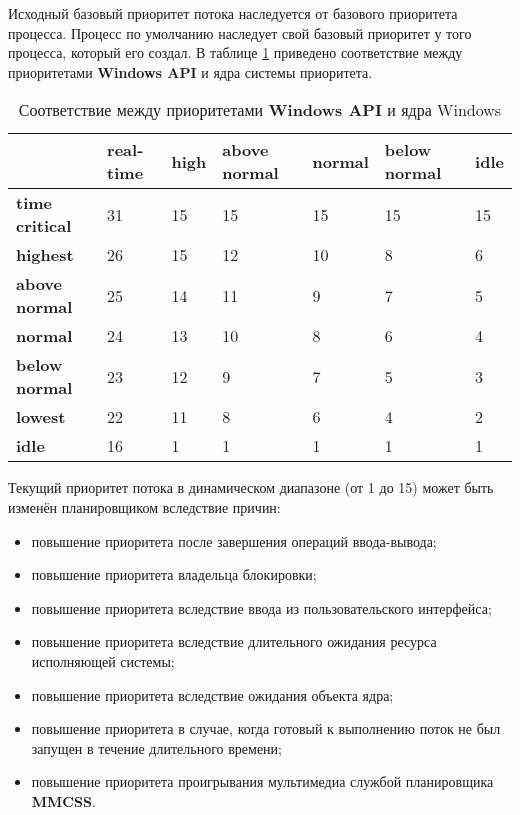 \noindent Исходный базовый приоритет потока наследуется от базового приоритета процесса. Процесс по умолчанию наследует свой базовый приоритет у того процесса, который его создал. В таблице \ref{tbl:priority} приведено соответствие между приоритетами \textbf{Windows API} и ядра системы приоритета.

\begin{table}[h]
    \caption{Соответствие между приоритетами \textbf{Windows API} и ядра Windows}
    \begin{center}
        \begin{tabular}{|l|p{45pt}|p{45pt}|p{45pt}|p{45pt}|p{45pt}|p{45pt}|}
            \hline
            {} & \textbf{real-time} & \textbf{high} & \textbf{above normal} & \textbf{normal} & \textbf{below normal} & \textbf{idle}\\
            \hline
            \textbf{time critical} & 31 & 15 & 15 & 15 & 15 & 15 \\
            \hline
            \textbf{highest} & 26 & 15 & 12 & 10 & 8 & 6 \\
            \hline
            \textbf{above normal} & 25 & 14 & 11 & 9 & 7 & 5 \\
            \hline
            \textbf{normal} & 24 & 13 & 10 & 8 & 6 & 4 \\
            \hline
            \textbf{below normal} & 23 & 12 & 9 & 7 & 5 & 3 \\
            \hline
            \textbf{lowest} & 22 & 11 & 8 & 6 & 4 & 2 \\
            \hline
            \textbf{idle} & 16 & 1 & 1 & 1 & 1 & 1 \\
            \hline
        \end{tabular}
    \end{center}
    \label{tbl:priority}
\end{table}


\noindent Текущий приоритет потока в динамическом диапазоне (от 1 до 15) может быть изменён планировщиком вследствие причин:

\begin{itemize}
    \item повышение приоритета после завершения операций ввода-вывода;
    \item повышение приоритета владельца блокировки;
    \item повышение приоритета вследствие ввода из пользовательского интерфейса;
    \item повышение приоритета вследствие длительного ожидания ресурса исполняющей системы;
    \item повышение приоритета вследствие ожидания объекта ядра;
    \item повышение приоритета в случае, когда готовый к выполнению поток не был запущен в течение длительного времени;
    \item повышение приоритета проигрывания мультимедиа службой планировщика \textbf{MMCSS}.
\end{itemize}

